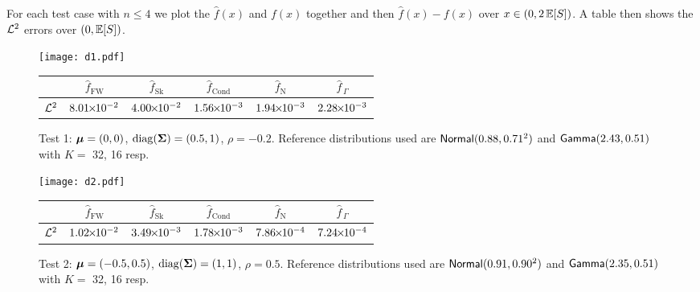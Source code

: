 For each test case with $n \le 4$ we plot the $\widehat{f}(x)$ and $f(x)$ together and then $\widehat{f}(x)-f(x)$ over $x \in (0, 2\operatorname{{\mathbb E}}[S])$. A table then shows the $\mathcal{L}^2$ errors over $(0, \operatorname{{\mathbb E}}[S])$.

\setlength\extrarowheight{3pt}

\begin{figure}[H]
\centering
\texttt{[image: d1.pdf]}

\vspace{4mm}

\begin{tabular}{c|c|c|c|c|c|}
\cline{2-6}
                         & $\widehat{f}_{\mathrm{FW}}$  & $\widehat{f}_{\mathrm{Sk}}$ & $\widehat{f}_{\mathrm{Cond}}$ & $\widehat{f}_{\mathrm{N}}$  & $\widehat{f}_{\,\Gamma}$ \\ \hline
\multicolumn{1}{|c|}{$\mathcal{L}^2$} & $8.01 {\mkern-2mu\times\mkern-2mu} 10^{-2}$ & $4.00 {\mkern-2mu\times\mkern-2mu} 10^{-2}$ & $1.56 {\mkern-2mu\times\mkern-2mu} 10^{-3}$ & $1.94 {\mkern-2mu\times\mkern-2mu} 10^{-3}$ & $2.28 {\mkern-2mu\times\mkern-2mu} 10^{-3}$ \\  \hline
\end{tabular}
\caption*{Test 1: $\bm{\mu} = (0, 0)$, $\mathrm{diag}(\bm{\Sigma}) = (0.5, 1)$, $\rho = -0.2$. Reference distributions used are $\mathsf{Normal}(0.88,0.71^2)$ and $\mathsf{Gamma}(2.43,0.51)$ with $K =$ 32, 16 resp.}
\end{figure}


\begin{figure}[H]
\centering
\texttt{[image: d2.pdf]}

\vspace{4mm}

\begin{tabular}{c|c|c|c|c|c|}
\cline{2-6}
                         & $\widehat{f}_{\mathrm{FW}}$  & $\widehat{f}_{\mathrm{Sk}}$ & $\widehat{f}_{\mathrm{Cond}}$ & $\widehat{f}_{\mathrm{N}}$  & $\widehat{f}_{\,\Gamma}$ \\ \hline
\multicolumn{1}{|c|}{$\mathcal{L}^2$} & $1.02 {\mkern-2mu\times\mkern-2mu} 10^{-2}$ & $3.49 {\mkern-2mu\times\mkern-2mu} 10^{-3}$ & $1.78 {\mkern-2mu\times\mkern-2mu} 10^{-3}$ & $7.86 {\mkern-2mu\times\mkern-2mu} 10^{-4}$ & $7.24 {\mkern-2mu\times\mkern-2mu} 10^{-4}$ \\ \hline
\end{tabular}
\caption*{Test 2: $\bm{\mu} = (-0.5, 0.5)$, $\mathrm{diag}(\bm{\Sigma})= (1,1)$, $\rho = 0.5$. Reference distributions used are $\mathsf{Normal}(0.91,0.90^2)$ and $\mathsf{Gamma}(2.35,0.51)$ with $K =$ 32, 16 resp.}
\end{figure}


